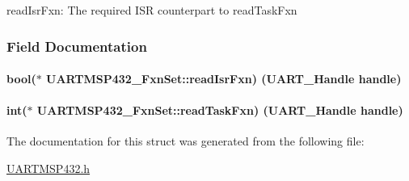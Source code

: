 read\+Isr\+Fxn\+: The required I\+S\+R counterpart to read\+Task\+Fxn 

\subsubsection{Field Documentation}
\paragraph[{read\+Isr\+Fxn}]{\setlength{\rightskip}{0pt plus 5cm}bool($\ast$ U\+A\+R\+T\+M\+S\+P432\+\_\+\+Fxn\+Set\+::read\+Isr\+Fxn) ({\bf U\+A\+R\+T\+\_\+\+Handle} handle)}\label{struct_u_a_r_t_m_s_p432___fxn_set_a36c8cc2c79e05138ab96e95b4b090fcf}
\paragraph[{read\+Task\+Fxn}]{\setlength{\rightskip}{0pt plus 5cm}int($\ast$ U\+A\+R\+T\+M\+S\+P432\+\_\+\+Fxn\+Set\+::read\+Task\+Fxn) ({\bf U\+A\+R\+T\+\_\+\+Handle} handle)}\label{struct_u_a_r_t_m_s_p432___fxn_set_a037fc6ffa691eb4eff208a14271c67ae}


The documentation for this struct was generated from the following file\+:\begin{DoxyCompactItemize}
\item 
\hyperlink{_u_a_r_t_m_s_p432_8h}{U\+A\+R\+T\+M\+S\+P432.\+h}\end{DoxyCompactItemize}
